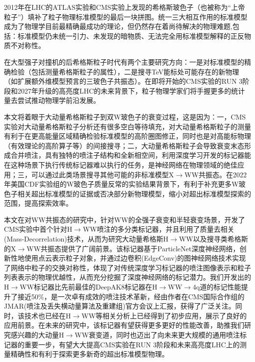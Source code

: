 \begin{cabstract}
    \kaishu
	2012年在LHC的ATLAS实验和CMS实验上发现的希格斯玻色子（也被称为“上帝粒子”）填补了粒子物理标准模型的最后一块拼图。统一三大相互作用的标准模型成为了物理学目前最精确最成功的理论，但仍然存在着尚待解决的物理难题,包括：标准模型仍未统一引力、未发现的暗物质、无法完全用标准模型解释的正反物质不对称性。
	
	在大型强子对撞机的后希格斯粒子时代有两个主要研究方向：一是对标准模型的精确检验（包括测量希格斯粒子的属性），二是搜寻TeV能标处可能存在的新物理（如扩展额外维模型预言的三玻色子共振态）。在即将开始的CMS实验的RUN 3阶段和2027年升级的高亮度LHC的未来背景下，粒子物理学家们将手握更多的统计量去尝试推动物理学前沿发展。
	
	本文将着眼于大动量希格斯粒子到双W玻色子的衰变过程，这是因为：一，CMS实验对大动量希格斯粒子分析还有很多空白等待填充，对大动量希格斯粒子的测量有利于在更高能量区域精确检验标准模型的高阶圈图修正，同时也是对高能标物理（有效理论的高阶算子等）的间接搜寻；二，大动量希格斯粒子会导致衰变末态形成合并喷注，具有独特的喷注子结构和全新相空间，利用深度学习开发的标记器能在这种场景下执行传统标记器难以执行的任务，是神经网络在物理领域的绝佳应用；三，可以通过此类场景搜寻其他可能的非标准模型X$\to$WW共振态。在2022年美国CDF实验组的W玻色子质量反常的实验结果背景下，有利于补充更多W玻色子相关超出标准模型的证据或否决部分新物理模型，缩小对超出标准模型探索的范围，提高探索效率。
	
	本文在对WW共振态的研究中，针对WW的全强子衰变和半轻衰变场景，开发了CMS实验中首个针对H$\to$WW喷注的多分类标记器，并且利用了质量去相关(Mass-Decorrelation)技术，从而为研究大动量希格斯H$\to$WW以及搜寻类希格斯的X$\to$WW共振态提供了广阔前景。该标记器基于ParticleNet深度神经网络，创新性地使用点云表示粒子对象，并通过边卷积(EdgeConv)的图神经网络技术实现了网络中粒子的交换对称性，体现了对传统深度学习标记器的喷注图像表示和粒子列表表示的物理优越性，从而充分挖掘了深度神经网络的标记潜力。我们开发出的H$\to$WW标记器比先前最佳的DeepAK8标记器在H$\to$WW$\to$4q道的标记性能提升了接近50\%，是一次卓有成效的喷注技术革新，经由作者在CMS国际合作组的JMAR(喷注及丢失横动量算法及重建组)官方会议上汇报，获得了广泛关注。同时，该技术也已经在H$\to$WW等相关分析上已经得到了初步应用，展示了良好的应用前景。在未来的研究中，该标记器有望获得更多更好的性能改善，助推我们研究感兴趣的大动量H$\to$WW衰变道，同时也迈出了向未来更大规模的通用喷注标记器的重要一步，有望大大提高CMS实验在RUN 3阶段和未来高亮度LHC上的测量精确性和有利于探索更多新奇的超出标准模型物理。
\end{cabstract}

